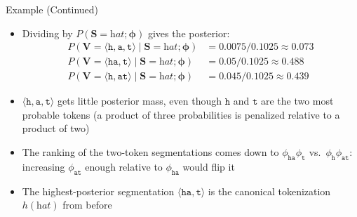 \documentclass[11pt,compress,t,notes=noshow, xcolor=table]{beamer}
\newcommand{\probs}{\boldsymbol{\phi}}
\begin{document}
\begin{frame}{Example (Continued)}

\vfill

\begin{itemize}
\item Dividing by $P(\mathbf{S} = \textit{hat}; \probs)$ gives the posterior:
\begin{align*}
P(\mathbf{V} = \langle \texttt{h}, \texttt{a}, \texttt{t} \rangle \mid \mathbf{S} = \textit{hat}; \probs) &= 0.0075 / 0.1025 \approx 0.073\\
P(\mathbf{V} = \langle \texttt{ha}, \texttt{t} \rangle \mid \mathbf{S} = \textit{hat}; \probs) &= 0.05 / 0.1025 \approx 0.488\\
P(\mathbf{V} = \langle \texttt{h}, \texttt{at} \rangle \mid \mathbf{S} = \textit{hat}; \probs) &= 0.045 / 0.1025 \approx 0.439
\end{align*}
\item $\langle \texttt{h}, \texttt{a}, \texttt{t} \rangle$ gets little posterior mass, even though $\texttt{h}$ and $\texttt{t}$ are the two most probable tokens (a product of three probabilities is penalized relative to a product of two)
\item The ranking of the two-token segmentations comes down to $\phi_{\texttt{ha}}\phi_{\texttt{t}}$ vs.\ $\phi_{\texttt{h}}\phi_{\texttt{at}}$: increasing $\phi_{\texttt{at}}$ enough relative to $\phi_{\texttt{ha}}$ would flip it
\item The highest-posterior segmentation $\langle \texttt{ha}, \texttt{t} \rangle$ is the canonical tokenization $h(\textit{hat})$ from before
\end{itemize}

\vfill

\end{frame}
\end{document}
